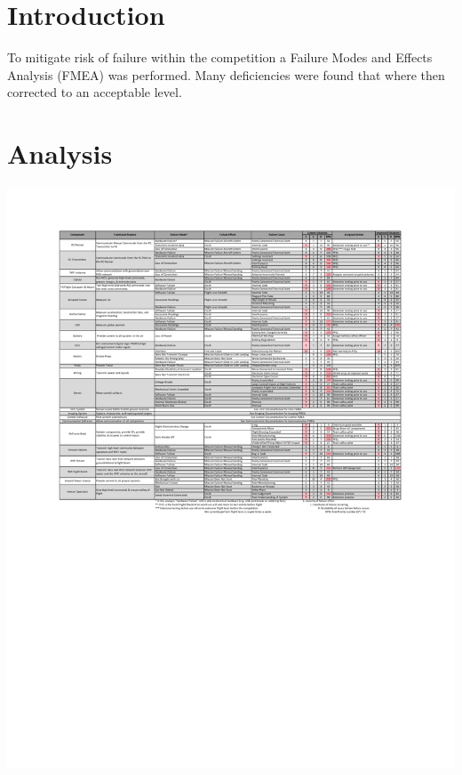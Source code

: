 \documentclass[]{auvsi_doc}
\begin{document}
\begin{AUVSITitlePage}
\begin{artifacttable}
\end{artifacttable}
\end{AUVSITitlePage}
\vspace*{-2cm}
\section{Introduction}
\vspace*{-0.5cm}
To mitigate risk of failure within the competition a Failure Modes and Effects Analysis (FMEA) was performed. Many deficiencies were found that where then corrected to an acceptable level.
\vspace*{-0.5cm}
\section{Analysis}
\vspace*{-0.5cm}
\hspace*{-1.25cm}
\includegraphics[width=1.2\textwidth]{./figs/FMEA.pdf}
\label{fig:reqMat}
\end{document}
